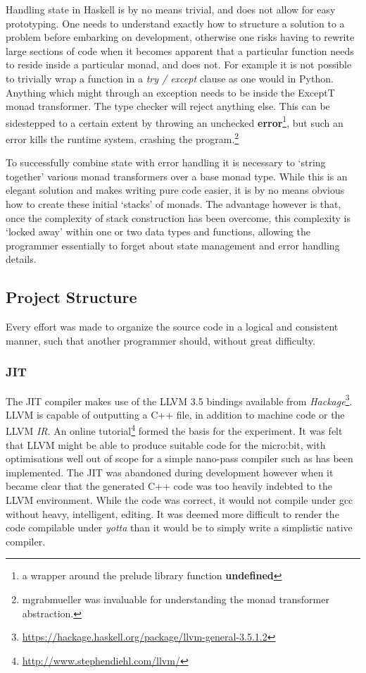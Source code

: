 \documentclass[12pt, a4paper]{report}
\begin{document}
Handling state in Haskell is by no means trivial, and does not allow for easy prototyping. One needs
to understand exactly how to structure a solution to a problem before embarking on development,
otherwise one risks having to rewrite large sections of code when it becomes apparent that a
particular function needs to reside inside a particular monad, and does not. For example it is not
possible to trivially wrap a function in a \textit{try / except} clause as one would in Python.
Anything which might through an exception needs to be inside the ExceptT monad transformer. The type
checker will reject anything else. This can be sidestepped to a certain extent by throwing an
unchecked \textbf{error}\footnote{a wrapper around the prelude library function \textbf{undefined}},
but such an error kills the runtime system, crashing the program.\footnote{mgrabmueller was
invaluable for understanding the monad transformer abstraction.}

To successfully combine state with error handling it is necessary to `string together' various monad
transformers over a base monad type. While this is an elegant solution and makes writing pure code
easier, it is by no means obvious how to create these initial `stacks' of monads. The advantage
however is that, once the complexity of stack construction has been overcome, this complexity is
`locked away' within one or two data types and functions, allowing the programmer essentially to
forget about state management and error handling details. 

\subsection{Project Structure}
Every effort was made to organize the source code in a logical and consistent manner, such that
another programmer should, without great difficulty.

\subsubsection{JIT}
The JIT compiler makes use of the LLVM 3.5 bindings available from
\textit{Hackage}\footnote{\url{https://hackage.haskell.org/package/llvm-general-3.5.1.2}}. LLVM is
capable of outputting a C++ file, in addition to machine code or the LLVM \textit{IR}. An online
tutorial\footnote{\url{http://www.stephendiehl.com/llvm/}} formed the basis for the experiment. It
was felt that LLVM might be able to produce suitable code for the micro:bit, with optimisations well
out of scope for a simple nano-pass compiler such as has been implemented. The JIT was abandoned
during development however when it became clear that the generated C++ code was too heavily indebted
to the LLVM environment. While the code was correct, it would not compile under gcc without heavy,
intelligent, editing. It was deemed more difficult to render the code compilable under
\textit{yotta} than it would be to simply write a simplistic native compiler.
\end{document}
